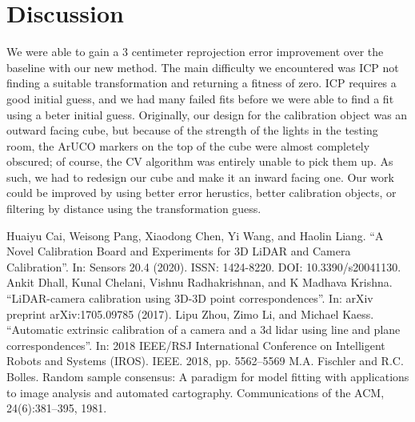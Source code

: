 \documentclass[conference]{IEEEtran}
\begin{document}
\section{Discussion}
We were able to gain a 3 centimeter reprojection error improvement over the baseline with our new method. The main difficulty we encountered was ICP not finding a suitable transformation and returning a fitness of zero. ICP requires a good initial guess, and we had many failed fits before we were able to find a fit using a beter initial guess. Originally, our design for the calibration object was an outward facing cube, but because of the strength of the lights in the testing room, the ArUCO markers on the top of the cube were almost completely obscured; of course, the CV algorithm was entirely unable to pick them up. As such, we had to redesign our cube and make it an inward facing one. Our work could be improved by using better error herustics, better calibration objects, or filtering by distance using the transformation guess.
\begin{thebibliography}{00}
 Huaiyu Cai, Weisong Pang, Xiaodong Chen, Yi Wang, and Haolin Liang. “A Novel Calibration Board and Experiments for 3D LiDAR and Camera Calibration”. In: Sensors 20.4 (2020). ISSN: 1424-8220. DOI: 10.3390/s20041130.
 Ankit Dhall, Kunal Chelani, Vishnu Radhakrishnan, and K Madhava Krishna. “LiDAR-camera calibration using 3D-3D point correspondences”. In: arXiv preprint arXiv:1705.09785 (2017).
 Lipu Zhou, Zimo Li, and Michael Kaess. “Automatic extrinsic calibration of a camera and a 3d lidar using line and plane correspondences”. In: 2018 IEEE/RSJ International Conference on Intelligent Robots and Systems (IROS). IEEE. 2018, pp. 5562–5569
 M.A. Fischler and R.C. Bolles. Random sample consensus: A paradigm for model
fitting with applications to image analysis and automated cartography. Communications of the ACM, 24(6):381–395, 1981.
\end{thebibliography}
\vspace{12pt}
\color{red}
\end{document}
